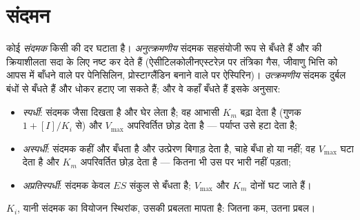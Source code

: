 \section{संदमन}

\begin{definition}[संदमक]\label{def:b1:enzymes:inhibitors}
कोई \emph{संदमक} किसी  की दर घटाता है।
\emph{अनुत्क्रमणीय} संदमक सहसंयोजी रूप से बँधते हैं और  की
क्रियाशीलता सदा के लिए नष्ट कर देते हैं (ऐसीटिलकोलीनएस्टरेज़ पर तंत्रिका
गैस, जीवाणु भित्ति को आपस में बाँधने वाले  पर पेनिसिलिन,
प्रोस्टाग्लैंडिन बनाने वाले  पर ऐस्पिरिन)। \emph{उत्क्रमणीय} संदमक
दुर्बल बंधों से बँधते हैं और धोकर हटाए जा सकते हैं; और वे कहाँ बँधते हैं
इसके अनुसार:
\begin{itemize}
  \item \emph{स्पर्धी}: संदमक  जैसा दिखता
        है और  घेर लेता है; वह आभासी $K_m$ बढ़ा देता है
        (गुणक $1 + [I]/K_i$ से) और $V_{\max}$ अपरिवर्तित छोड़ देता है
        --- पर्याप्त  उसे हटा देता है;
  \item \emph{अस्पर्धी}: संदमक कहीं और बँधता है और उत्प्रेरण बिगाड़
        देता है, चाहे  बँधा हो या नहीं; वह $V_{\max}$ घटा देता
        है और $K_m$ अपरिवर्तित छोड़ देता है --- कितना भी
         उस पर भारी नहीं पड़ता;
  \item \emph{अप्रतिस्पर्धी}: संदमक केवल $ES$ संकुल से बँधता है;
        $V_{\max}$ और $K_m$ दोनों घट जाते हैं।
\end{itemize}
$K_i$, यानी संदमक का वियोजन स्थिरांक, उसकी प्रबलता मापता है: जितना कम,
उतना प्रबल।
\end{definition}

